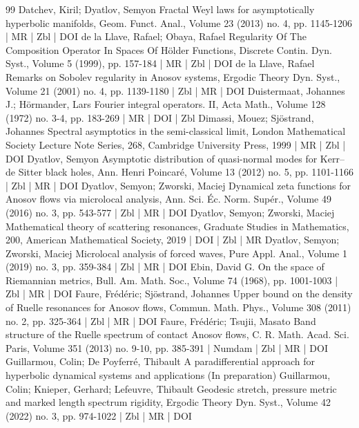 \begin{thebibliography}{99}
Datchev, Kiril; Dyatlov, Semyon Fractal Weyl laws for asymptotically hyperbolic manifolds, Geom. Funct. Anal., Volume 23 (2013) no. 4, pp. 1145-1206 | MR | Zbl | DOI
de la Llave, Rafael; Obaya, Rafael Regularity Of The Composition Operator In Spaces Of Hölder Functions, Discrete Contin. Dyn. Syst., Volume 5 (1999), pp. 157-184 | MR | Zbl | DOI
de la Llave, Rafael Remarks on Sobolev regularity in Anosov systems, Ergodic Theory Dyn. Syst., Volume 21 (2001) no. 4, pp. 1139-1180 | Zbl | MR | DOI
Duistermaat, Johannes J.; Hörmander, Lars Fourier integral operators. II, Acta Math., Volume 128 (1972) no. 3-4, pp. 183-269 | MR | DOI | Zbl
Dimassi, Mouez; Sjöstrand, Johannes Spectral asymptotics in the semi-classical limit, London Mathematical Society Lecture Note Series, 268, Cambridge University Press, 1999 | MR | Zbl | DOI
Dyatlov, Semyon Asymptotic distribution of quasi-normal modes for Kerr–de Sitter black holes, Ann. Henri Poincaré, Volume 13 (2012) no. 5, pp. 1101-1166 | Zbl | MR | DOI
Dyatlov, Semyon; Zworski, Maciej Dynamical zeta functions for Anosov flows via microlocal analysis, Ann. Sci. Éc. Norm. Supér., Volume 49 (2016) no. 3, pp. 543-577 | Zbl | MR | DOI
Dyatlov, Semyon; Zworski, Maciej Mathematical theory of scattering resonances, Graduate Studies in Mathematics, 200, American Mathematical Society, 2019 | DOI | Zbl | MR
Dyatlov, Semyon; Zworski, Maciej Microlocal analysis of forced waves, Pure Appl. Anal., Volume 1 (2019) no. 3, pp. 359-384 | Zbl | MR | DOI
Ebin, David G. On the space of Riemannian metrics, Bull. Am. Math. Soc., Volume 74 (1968), pp. 1001-1003 | Zbl | MR | DOI
Faure, Frédéric; Sjöstrand, Johannes Upper bound on the density of Ruelle resonances for Anosov flows, Commun. Math. Phys., Volume 308 (2011) no. 2, pp. 325-364 | Zbl | MR | DOI
Faure, Frédéric; Tsujii, Masato Band structure of the Ruelle spectrum of contact Anosov flows, C. R. Math. Acad. Sci. Paris, Volume 351 (2013) no. 9-10, pp. 385-391 | Numdam | Zbl | MR | DOI
Guillarmou, Colin; De Poyferré, Thibault A paradifferential approach for hyperbolic dynamical systems and applications (In preparation)
Guillarmou, Colin; Knieper, Gerhard; Lefeuvre, Thibault Geodesic stretch, pressure metric and marked length spectrum rigidity, Ergodic Theory Dyn. Syst., Volume 42 (2022) no. 3, pp. 974-1022 | Zbl | MR | DOI

\end{thebibliography}
